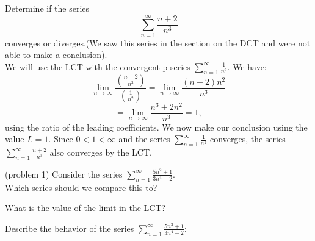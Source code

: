 \documentclass[handout]{ximera}
\begin{document}
\begin{example}[example 1]
Determine if the series 
\[
\sum_{n=1}^\infty \frac{n+2}{n^3}
\]
converges or diverges.(We saw this series in the section on the DCT and were not able to make a conclusion).\\
We will use the LCT with the convergent p-series $\displaystyle{\sum_{n=1}^\infty \frac{1}{n^2}}$. We have:
\[
\lim_{n \to \infty} \frac{\left(\frac{n+2}{n^3}\right)}{\left(\frac{1}{n^2}\right)} = \lim_{n \to \infty} \frac{(n+2)n^2}{n^3}
\]
\[
= \lim_{n \to \infty} \frac{n^3 +2n^2}{n^3} = 1,
\]
using the ratio of the leading coefficients. We now make our conclusion using the value $L = 1$. Since $0 < 1 < \infty$ and the series $\displaystyle{\sum_{n=1}^\infty \frac{1}{n^2}}$
converges, the series $\displaystyle{\sum_{n=1}^\infty \frac{n+2}{n^3}}$ also converges by the LCT.
\end{example}




\begin{problem}(problem 1)
Consider the series $\displaystyle{\sum_{n=1}^\infty \frac{5n^2 + 1}{3n^4 - 2}}$.\\
Which series should we compare this to?

\begin{multipleChoice}
\end{multipleChoice}

What is the value of the limit in the LCT?
\begin{multipleChoice}
\end{multipleChoice}

Describe the behavior of the series $\displaystyle{\sum_{n=1}^\infty \frac{5n^2 + 1}{3n^4 - 2}:}$
\begin{multipleChoice}
\end{multipleChoice}

\end{problem}
\end{document}
